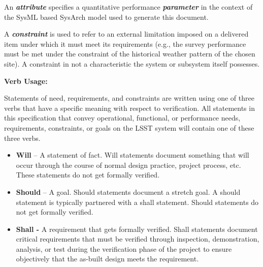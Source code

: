 \documentclass[SE,toc,lsstdraft]{lsstdoc}
\begin{document}
An \textbf{\textit{attribute}} specifies a quantitative performance \textbf{\textit{parameter}} in the context of the SysML based SysArch model used to generate this document.









A \textbf{\textit{constraint}} is used to refer to an external limitation imposed on a delivered item under which it must meet its requirements (e.g., the survey performance must be met under the constraint of the historical weather pattern of the chosen site). A constraint in not a characteristic the system or subsystem itself possesses.









\textbf{Verb Usage:}









Statements of need, requirements, and constraints are written using one of three verbs that have a specific meaning with respect to verification. All statements in this specification that convey operational, functional, or performance needs, requirements, constraints, or goals on the LSST system will contain one of these three verbs.



    \begin{itemize}
\item
\textbf{Will} – A statement of fact. Will statements document something that will occur through the course of normal design practice, project process, etc. These statements do not get formally verified.

\item
\textbf{Should} – A goal. Should statements document a stretch goal. A should statement is typically partnered with a shall statement. Should statements do not get formally verified.

\item
\textbf{Shall - }A requirement that gets formally verified. Shall statements document critical requirements that must be verified through inspection, demonstration, analysis, or test during the verification phase of the project to ensure objectively that the as-built design meets the requirement.

    \end{itemize}
\end{document}
